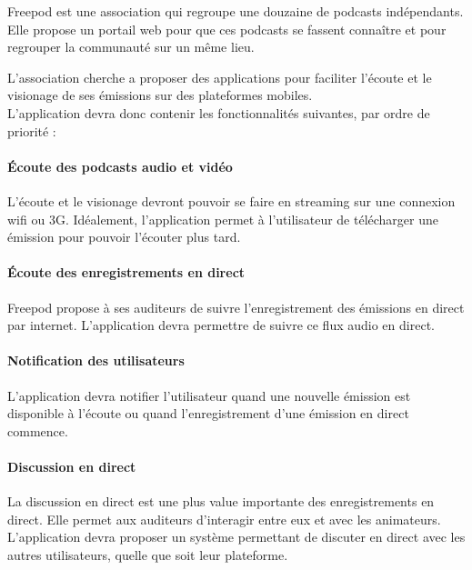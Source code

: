 \documentclass[11pt, french]{report}
\begin{document}
Freepod est une association qui regroupe une douzaine de podcasts indépendants. Elle propose un portail web pour que ces podcasts se fassent connaître et pour regrouper la communauté sur un même lieu.

L’association cherche a proposer des applications pour faciliter l’écoute et le visionage de ses émissions sur des plateformes mobiles.\\

L’application devra donc contenir les fonctionnalités suivantes, par ordre de priorité :

\paragraph{Écoute des podcasts audio et vidéo}
L’écoute et le visionage devront pouvoir se faire en streaming sur une connexion wifi ou 3G. Idéalement, l’application permet à l’utilisateur de télécharger une émission pour pouvoir l’écouter plus tard.

\paragraph{Écoute des enregistrements en direct}
Freepod propose à ses auditeurs de suivre l’enregistrement des émissions en direct par internet. L’application devra permettre de suivre ce flux audio en direct.

\paragraph{Notification des utilisateurs}
L’application devra notifier l’utilisateur quand une nouvelle émission est disponible à l’écoute ou quand l’enregistrement d’une émission en direct commence.

\paragraph{Discussion en direct}
La discussion en direct est une plus value importante des enregistrements en direct. Elle permet aux auditeurs d'interagir entre eux et avec les animateurs. L’application devra proposer un système permettant de discuter en direct avec les autres utilisateurs, quelle que soit leur plateforme.\\
\end{document}
